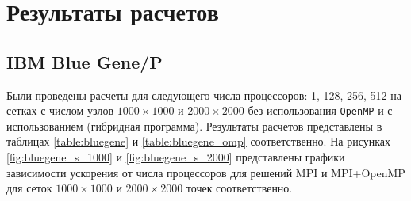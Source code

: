 \section{Результаты расчетов}

\subsection{IBM Blue Gene/P}

Были проведены расчеты для следующего числа процессоров: 1, 128, 256, 512 на сетках с числом узлов $1000 \times 1000$ и $2000 \times 2000$ без использования \texttt{OpenMP} и с использованием (гибридная программа). Результаты расчетов представлены в таблицах \ref{table:bluegene} и \ref{table:bluegene_omp} соответственно. На рисунках \ref{fig:bluegene_s_1000} и \ref{fig:bluegene_s_2000} представлены графики зависимости ускорения от числа процессоров для решений MPI и MPI+OpenMP для сеток $1000 \times 1000$ и $2000 \times 2000$ точек соответственно.

\begin{table}[H]
  \centering
  
  \caption{Таблица с результатами расчетов на ПВС <<IBM Blue Gene/P>> без использования \texttt{OpenMP}.}
  \label{table:bluegene}
\end{table}

